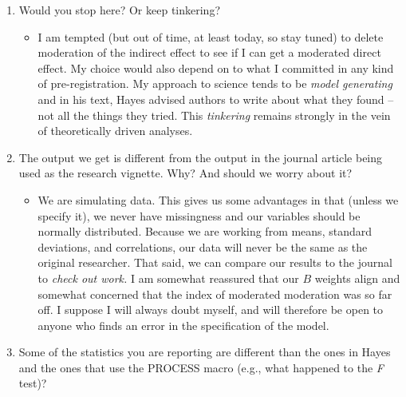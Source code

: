 \documentclass[
]{book}
\providecommand{\tightlist}{%
  \setlength{\itemsep}{0pt}\setlength{\parskip}{0pt}}
\begin{document}
\begin{enumerate}
\def\labelenumi{\arabic{enumi}.}
\tightlist
\item
  Would you stop here? Or keep tinkering?

  \begin{itemize}
  \tightlist
  \item
    I am tempted (but out of time, at least today, so stay tuned) to delete moderation of the indirect effect to see if I can get a moderated direct effect. My choice would also depend on to what I committed in any kind of pre-registration. My approach to science tends to be \emph{model generating} \citep{bollen_testing_1993} and in his text, Hayes \citeyearpar{hayes_introduction_2018} advised authors to write about what they found -- not all the things they tried. This \emph{tinkering} remains strongly in the vein of theoretically driven analyses.
  \end{itemize}
\item
  The output we get is different from the output in the journal article being used as the research vignette. Why? And should we worry about it?

  \begin{itemize}
  \tightlist
  \item
    We are simulating data. This gives us some advantages in that (unless we specify it), we never have missingness and our variables should be normally distributed. Because we are working from means, standard deviations, and correlations, our data will never be the same as the original researcher. That said, we can compare our results to the journal to \emph{check out work.} I am somewhat reassured that our \(B\) weights align and somewhat concerned that the index of moderated moderation was so far off. I suppose I will always doubt myself, and will therefore be open to anyone who finds an error in the specification of the model.
  \end{itemize}
\item
  Some of the statistics you are reporting are different than the ones in Hayes and the ones that use the PROCESS macro (e.g., what happened to the \emph{F} test)?


\end{enumerate}
\end{document}
